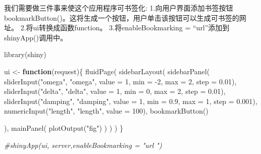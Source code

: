\documentclass[
]{book}
\newenvironment{Shaded}{\begin{snugshade}}{\end{snugshade}}
\newcommand{\AttributeTok}[1]{\textcolor[rgb]{0.77,0.63,0.00}{#1}}
\newcommand{\CommentTok}[1]{\textcolor[rgb]{0.56,0.35,0.01}{\textit{#1}}}
\newcommand{\ConstantTok}[1]{\textcolor[rgb]{0.00,0.00,0.00}{#1}}
\newcommand{\ControlFlowTok}[1]{\textcolor[rgb]{0.13,0.29,0.53}{\textbf{#1}}}
\newcommand{\DecValTok}[1]{\textcolor[rgb]{0.00,0.00,0.81}{#1}}
\newcommand{\FloatTok}[1]{\textcolor[rgb]{0.00,0.00,0.81}{#1}}
\newcommand{\FunctionTok}[1]{\textcolor[rgb]{0.00,0.00,0.00}{#1}}
\newcommand{\NormalTok}[1]{#1}
\newcommand{\OtherTok}[1]{\textcolor[rgb]{0.56,0.35,0.01}{#1}}
\newcommand{\SpecialCharTok}[1]{\textcolor[rgb]{0.00,0.00,0.00}{#1}}
\newcommand{\StringTok}[1]{\textcolor[rgb]{0.31,0.60,0.02}{#1}}
\begin{document}
\begin{Shaded}
\end{Shaded}

我们需要做三件事来使这个应用程序可书签化:
1.向用户界面添加书签按钮bookmarkButton()。这将生成一个按钮，用户单击该按钮可以生成可书签的网址。
2.将ui转换成函数function。
3.将enableBookmarking = ``url''添加到shinyApp()调用中。

\begin{Shaded}
\begin{Highlighting}[]
\FunctionTok{library}\NormalTok{(shiny)}

\NormalTok{ui }\OtherTok{\textless{}{-}} \ControlFlowTok{function}\NormalTok{(request)\{}
  \FunctionTok{fluidPage}\NormalTok{(}
    \FunctionTok{sidebarLayout}\NormalTok{(}
      \FunctionTok{sidebarPanel}\NormalTok{(}
        \FunctionTok{sliderInput}\NormalTok{(}\StringTok{"omega"}\NormalTok{, }\StringTok{"omega"}\NormalTok{, }\AttributeTok{value =} \DecValTok{1}\NormalTok{, }\AttributeTok{min =} \SpecialCharTok{{-}}\DecValTok{2}\NormalTok{, }\AttributeTok{max =} \DecValTok{2}\NormalTok{, }\AttributeTok{step =} \FloatTok{0.01}\NormalTok{),}
        \FunctionTok{sliderInput}\NormalTok{(}\StringTok{"delta"}\NormalTok{, }\StringTok{"delta"}\NormalTok{, }\AttributeTok{value =} \DecValTok{1}\NormalTok{, }\AttributeTok{min =} \DecValTok{0}\NormalTok{, }\AttributeTok{max =} \DecValTok{2}\NormalTok{, }\AttributeTok{step =} \FloatTok{0.01}\NormalTok{),}
        \FunctionTok{sliderInput}\NormalTok{(}\StringTok{"damping"}\NormalTok{, }\StringTok{"damping"}\NormalTok{, }\AttributeTok{value =} \DecValTok{1}\NormalTok{, }\AttributeTok{min =} \FloatTok{0.9}\NormalTok{, }\AttributeTok{max =} \DecValTok{1}\NormalTok{, }\AttributeTok{step =} \FloatTok{0.001}\NormalTok{),}
        \FunctionTok{numericInput}\NormalTok{(}\StringTok{"length"}\NormalTok{, }\StringTok{"length"}\NormalTok{, }\AttributeTok{value =} \DecValTok{100}\NormalTok{),}
        \FunctionTok{bookmarkButton}\NormalTok{()}
        
\NormalTok{      ),}
      \FunctionTok{mainPanel}\NormalTok{(}
        \FunctionTok{plotOutput}\NormalTok{(}\StringTok{"fig"}\NormalTok{)}
\NormalTok{      )}
\NormalTok{    )}
\NormalTok{  )}
\NormalTok{\}}

\CommentTok{\#shinyApp(ui, server,enableBookmarking = "url ")}
\end{Highlighting}
\end{Shaded}
\end{document}
